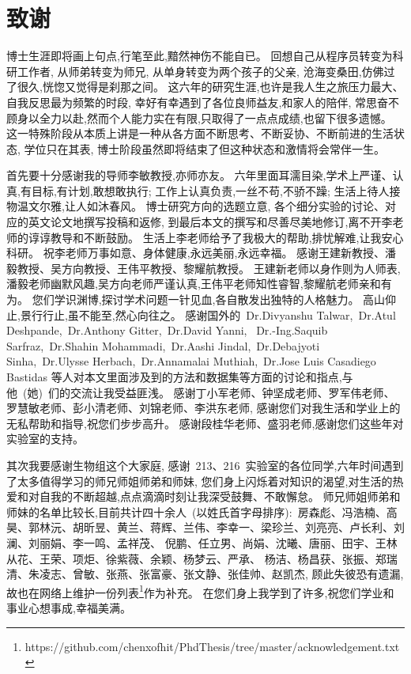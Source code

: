 \section{致谢} %

博士生涯即将画上句点,行笔至此,黯然神伤不能自已。
回想自己从程序员转变为科研工作者,
从师弟转变为师兄,
从单身转变为两个孩子的父亲,
沧海变桑田,仿佛过了很久,恍惚又觉得是刹那之间。
这六年的研究生涯,也许是我人生之旅压力最大、自我反思最为频繁的时段,
幸好有幸遇到了各位良师益友,和家人的陪伴,
常思奋不顾身以全力以赴,然而个人能力实在有限,只取得了一点点成绩,也留下很多遗憾。
这一特殊阶段从本质上讲是一种从各方面不断思考、不断妥协、不断前进的生活状态,
学位只在其表,
博士阶段虽然即将结束了但这种状态和激情将会常伴一生。

首先要十分感谢我的导师李敏教授,亦师亦友。
六年里面耳濡目染,学术上严谨、认真,有目标,有计划,敢想敢执行;
工作上认真负责,一丝不苟,不骄不躁;
生活上待人接物温文尔雅,让人如沐春风。
博士研究方向的选题立意,
各个细分实验的讨论、对应的英文论文地撰写投稿和返修,
到最后本文的撰写和尽善尽美地修订,离不开李老师的谆谆教导和不断鼓励。
生活上李老师给予了我极大的帮助,排忧解难,让我安心科研。
祝李老师万事如意、身体健康,永远美丽,永远幸福。
感谢王建新教授、潘毅教授、吴方向教授、王伟平教授、黎耀航教授。
王建新老师以身作则为人师表,潘毅老师幽默风趣,吴方向老师严谨认真,王伟平老师知性睿智,黎耀航老师亲和有为。
您们学识渊博,探讨学术问题一针见血,各自散发出独特的人格魅力。
高山仰止,景行行止,虽不能至,然心向往之。
感谢国外的~Dr.Divyanshu Talwar,~Dr.Atul Deshpande,~Dr.Anthony Gitter,~Dr.David Yanni,
~Dr.-Ing.Saquib Sarfraz,~Dr.Shahin Mohammadi,~Dr.Aashi Jindal,~Dr.Debajyoti Sinha,~Dr.Ulysse Herbach,~Dr.Annamalai Muthiah,~Dr.Jose Luis Casadiego Bastidas
等人对本文里面涉及到的方法和数据集等方面的讨论和指点,与他~(她)~们的交流让我受益匪浅。
感谢丁小军老师、钟坚成老师、罗军伟老师、罗慧敏老师、彭小清老师、刘锦老师、李洪东老师,
感谢您们对我生活和学业上的无私帮助和指导,祝您们步步高升。
感谢段桂华老师、盛羽老师,感谢您们这些年对实验室的支持。

其次我要感谢生物组这个大家庭,
感谢~213、216~实验室的各位同学,六年时间遇到了太多值得学习的师兄师姐师弟和师妹,
您们身上闪烁着对知识的渴望,对生活的热爱和对自我的不断超越,点点滴滴时刻让我深受鼓舞、不敢懈怠。
师兄师姐师弟和师妹的名单比较长,目前共计四十余人~(以姓氏首字母排序):~房森彪、冯浩楠、高昊、郭林沅、胡昕昱、黄兰、蒋辉、兰伟、李幸一、梁珍兰、刘亮亮、卢长利、刘澜、刘丽娟、李一鸣、孟祥茂、
倪鹏、任立男、尚娟、沈曦、唐丽、田宇、王林从花、王荣、项炬、徐紫薇、余颖、杨梦云、严承、 杨洁、杨昌获、张振、郑瑞清、朱凌志、曾敏、张燕、张富豪、张文静、张佳帅、赵凯杰,
顾此失彼恐有遗漏,故也在网络上维护一份列表\footnote{https://github.com/chenxofhit/PhdThesis/tree/master/acknowledgement.txt}作为补充。
在您们身上我学到了许多,祝您们学业和事业心想事成,幸福美满。

